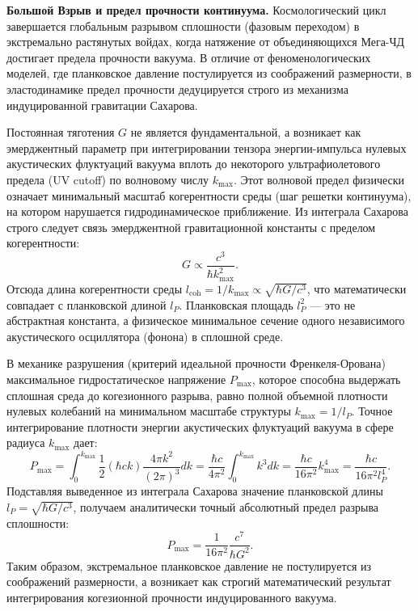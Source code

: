 \documentclass[11pt,a4paper]{article}
\begin{document}
	\textbf{Большой Взрыв и предел прочности континуума.} 
	Космологический цикл завершается глобальным разрывом сплошности (фазовым переходом) в экстремально растянутых войдах, когда натяжение от объединяющихся Мега-ЧД достигает предела прочности вакуума. В отличие от феноменологических моделей, где планковское давление постулируется из соображений размерности, в эластодинамике предел прочности дедуцируется строго из механизма индуцированной гравитации Сахарова.
	
	Постоянная тяготения $G$ не является фундаментальной, а возникает как эмерджентный параметр при интегрировании тензора энергии-импульса нулевых акустических флуктуаций вакуума вплоть до некоторого ультрафиолетового предела (UV cutoff) по волновому числу $k_{\text{max}}$. Этот волновой предел физически означает минимальный масштаб когерентности среды (шаг решетки континуума), на котором нарушается гидродинамическое приближение. 
	Из интеграла Сахарова строго следует связь эмерджентной гравитационной константы с пределом когерентности:
	\begin{equation}
		G \propto \frac{c^3}{\hbar k_{\text{max}}^2}.
	\end{equation}
	Отсюда длина когерентности среды $l_{\text{coh}} = 1/k_{\text{max}} \propto \sqrt{\hbar G / c^3}$, что математически совпадает с планковской длиной $l_P$. Планковская площадь $l_P^2$ — это не абстрактная константа, а физическое минимальное сечение одного независимого акустического осциллятора (фонона) в сплошной среде.
	
	В механике разрушения (критерий идеальной прочности Френкеля-Орована) максимальное гидростатическое напряжение $P_{\text{max}}$, которое способна выдержать сплошная среда до когезионного разрыва, равно полной объемной плотности нулевых колебаний на минимальном масштабе структуры $k_{\text{max}} = 1/l_P$.
	Точное интегрирование плотности энергии акустических флуктуаций вакуума в сфере радиуса $k_{\text{max}}$ дает:
	\begin{equation}
		P_{\text{max}} = \int_0^{k_{\text{max}}} \frac{1}{2} (\hbar c k) \frac{4\pi k^2}{(2\pi)^3} dk = \frac{\hbar c}{4\pi^2} \int_0^{k_{\text{max}}} k^3 dk = \frac{\hbar c}{16\pi^2} k_{\text{max}}^4 = \frac{\hbar c}{16\pi^2 l_P^4}.
	\end{equation}
	Подставляя выведенное из интеграла Сахарова значение планковской длины $l_P = \sqrt{\hbar G / c^3}$, получаем аналитически точный абсолютный предел разрыва сплошности:
	\begin{equation}
		P_{\text{max}} = \frac{1}{16\pi^2} \frac{c^7}{\hbar G^2}.
	\end{equation}
	Таким образом, экстремальное планковское давление не постулируется из соображений размерности, а возникает как строгий математический результат интегрирования когезионной прочности индуцированного вакуума.
	
\end{document}
